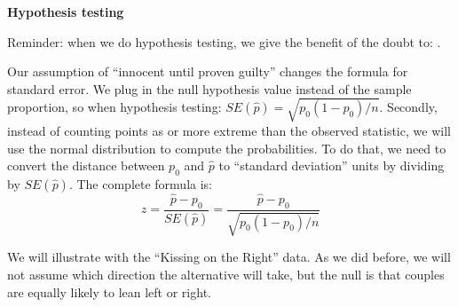    \begin{center}
     {\large\bf   Hypothesis testing }
   \end{center}

 Reminder:  when we do hypothesis testing, we give the benefit
 of the doubt to: \underline{\hspace{1in}}.

 Our assumption of ``innocent until proven guilty'' changes the
 formula for standard error.  We plug in the null hypothesis value
 instead of the sample proportion, so when hypothesis testing: $
 SE(\widehat{p}) = \sqrt{p_0(1-p_0)/n}$. Secondly, instead of counting
 points as or more extreme than the observed statistic, we will use
 the normal distribution to compute the probabilities.  To do that, we
 need to convert the distance between $p_0$ and $\widehat{p}$ to ``standard
 deviation'' units by dividing by $SE(\widehat{p})$.  The complete
 formula is:
  $$ z = \frac{\widehat{p} - p_0}{SE(\widehat{p})} = 
         \frac{\widehat{p} - p_0}{\sqrt{p_0(1-p_0)/n}}$$
   
 We will illustrate with the ``Kissing on the Right'' data. As we did
 before, we will not assume which direction the alternative will
 take, but the null is that couples are equally likely to lean
 left or right. 
 
